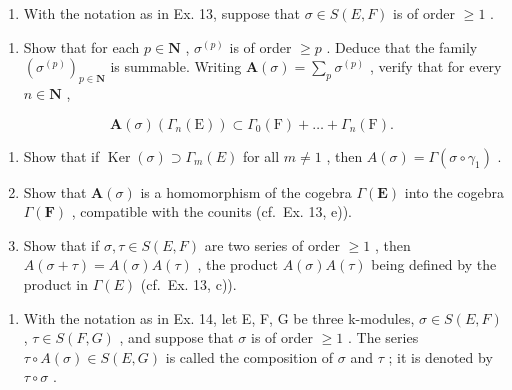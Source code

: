 \begin{enumerate}
\def\labelenumi{\arabic{enumi})}
\setcounter{enumi}{13}
\tightlist
\item
  With the notation as in Ex. 13, suppose that \(\sigma \in S(E, F)\) is of order \(\geqslant 1\) .
\end{enumerate}

\begin{enumerate}
\def\labelenumi{\alph{enumi})}
\tightlist
\item
  Show that for each \(p \in \mathbf{N}\) , \(\sigma^{(p)}\) is of order \(\geqslant p\) . Deduce that the family \((\sigma^{(p)})_{p \in \mathbf{N}}\) is summable. Writing \(\mathbf{A}(\sigma) = \sum_{p} \sigma^{(p)}\) , verify that for every \(n \in \mathbf{N}\) ,
\end{enumerate}

\[
\mathbf {A} (\sigma) \left(\Gamma_ {n} (\mathrm{E})\right) \subset \Gamma_ {0} (\mathrm{F}) + \dots + \Gamma_ {n} (\mathrm{F}).
\]

\begin{enumerate}
\def\labelenumi{\alph{enumi})}
\setcounter{enumi}{1}
\item
  Show that if \(\operatorname{Ker}(\sigma) \supset \Gamma_m(E)\) for all \(m \neq 1\) , then \(A(\sigma) = \Gamma(\sigma \circ \gamma_1)\) .
\item
  Show that \(\mathbf{A}(\sigma)\) is a homomorphism of the cogebra \(\Gamma(\mathbf{E})\) into the cogebra \(\Gamma(\mathbf{F})\) , compatible with the counits (cf.~Ex. 13, e)).
\item
  Show that if \(\sigma, \tau \in S(E, F)\) are two series of order \(\geqslant 1\) , then \(A(\sigma + \tau) = A(\sigma)A(\tau)\) , the product \(A(\sigma)A(\tau)\) being defined by the product in \(\Gamma(E)\) (cf.~Ex. 13, c)).
\end{enumerate}

\begin{enumerate}
\def\labelenumi{\arabic{enumi})}
\setcounter{enumi}{14}
\tightlist
\item
  With the notation as in Ex. 14, let E, F, G be three k-modules, \(\sigma \in S(E, F)\) , \(\tau \in S(F, G)\) , and suppose that \(\sigma\) is of order \(\geqslant 1\) . The series \(\tau \circ A(\sigma) \in S(E, G)\) is called the composition of \(\sigma\) and \(\tau\) ; it is denoted by \(\tau \circ \sigma\) .
\end{enumerate}

